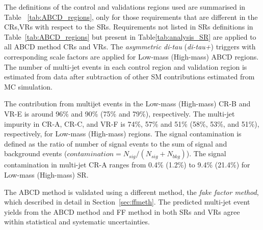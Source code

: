  	The definitions of the control and validations regions used are summarised in Table ~\ref{tab:ABCD_regions}, only for those requirements that are different in the \acp{CR},\acp{VR} with respect to the \acp{SR}. Requirements not listed in \acp{SR} definitions in Table~\ref{tab:ABCD_regions} but present in Table\ref{tab:analysis_SR} are applied to all ABCD method \acp{CR} and \acp{VR}. The \textit{asymmetric di-tau} (\textit{di-tau+\met}) triggers with corresponding scale factors are applied for Low-mass (High-mass) ABCD regions. 
	The number of multi-jet events in each control region and validation region is estimated from data after subtraction of other \ac{SM} contributions estimated from \ac{MC} simulation. 
	\begin{table}[!hbt]
	\centering
	\caption{The multi-jet \ac{CR} and \ac{VR} definitions for Low-mass (left) and High-mass (right) \acp{SR}. 
	Only requirements that different in the \acp{CR},\acp{VR} with respect to \ac{SR} definitions are listed.}
	\resizebox{\textwidth}{!}{
		
	\quad
		
	}
	\label{tab:ABCD_regions}
	\end{table}
	The contribution from multijet events in the Low-mass (High-mass) \ac{CR}-B and \ac{VR}-E is around 96\% and 90\% (75\% and 79\%), respectively. The multi-jet impurity in \ac{CR}-A, \ac{CR}-C, and \ac{VR}-F is 74\%, 57\% and 51\% (58\%, 53\%, and 51\%), respectively, for Low-mass (High-mass) regions. 
	The signal contamination is defined as the ratio of number of signal events to the sum of signal and background events ($\textit{contamination}=N_{sig}/(N_{sig}+N_{bkg})$). The signal contamination in multi-jet \ac{CR}-A ranges from 0.4\% (1.2\%) to 9.4\% (21.4\%) for Low-mass (High-mass) \ac{SR}.
	
	The ABCD method is validated using a different method, the \textit{fake factor method}, which described in detail in Section~\ref{sec:ffmeth}. The predicted multi-jet event yields from the ABCD method and \ac{FF} method in both \acp{SR} and \acp{VR} agree within statistical and systematic uncertainties. 
	 

